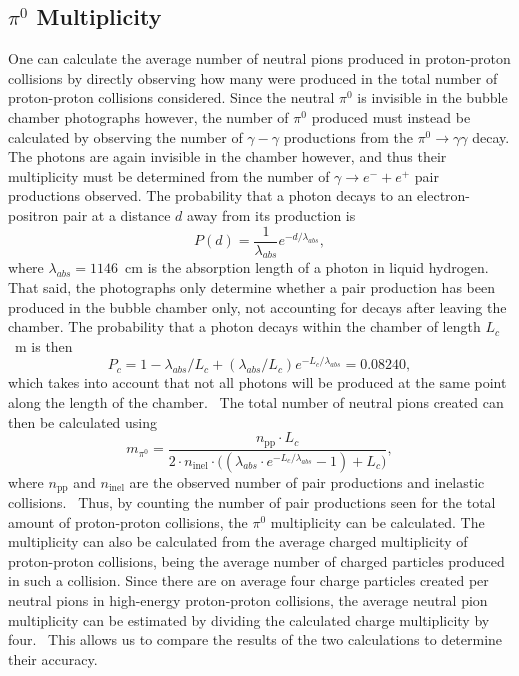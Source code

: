 \documentclass[twocolumn]{article}
\begin{document}
\subsection{$\pi^0$ Multiplicity}
One can calculate the average number of neutral pions produced in proton-proton collisions by directly observing how many were produced in the total number of proton-proton collisions considered. Since the neutral $\pi^0$ is invisible in the bubble chamber photographs however, the number of $\pi^0$ produced must instead be calculated by observing the number of $\gamma-\gamma$ productions from the $\pi^0 \to \gamma \gamma$ decay. The photons are again invisible in the chamber however, and thus their multiplicity must be determined from the number of $\gamma \to e^- + e^+$ pair productions observed. The probability that a photon decays to an electron-positron pair at a distance $d$ away from its production is~\cite{seul}
\begin{equation*}
P(d) = \frac {1} {\lambda_{abs}} e^{-d/\lambda_{abs}},
\end{equation*}
where $\lambda_{abs} = 1146$~cm is the absorption length of a photon in liquid hydrogen. That said, the photographs only determine whether a pair production has been produced in the bubble chamber only, not accounting for decays after leaving the chamber. The probability that a photon decays within the chamber of length $L_c$~m is then
\begin{equation}
P_c = 1-\lambda_{abs}/L_c +  (\lambda_{abs}/L_c) e^{-L_c/\lambda_{abs}} = 0.08240,
\end{equation}
which takes into account that not all photons will be produced at the same point along the length of the chamber.~\cite{seul} The total number of neutral pions created can then be calculated using
\begin{equation} \label{eq:mult}
m_{\pi^0} = \frac{n_{\text{pp}}\cdot L_c}{2\cdot n_{\text{inel}} \cdot \big((\lambda_{abs} \cdot e^{- L_c/\lambda_{abs}}-1)+L_c\big)},
\end{equation}
where $n_{\text{pp}}$ and $n_{\text{inel}}$ are the observed number of pair productions and inelastic collisions.~\cite{seul} Thus, by counting the number of pair productions seen for the total amount of proton-proton collisions, the $\pi^0$ multiplicity can be calculated. The multiplicity can also be calculated from the average charged multiplicity of proton-proton collisions, being the average number of charged particles produced in such a collision. Since there are on average four charge particles created per neutral pions in high-energy proton-proton collisions, the average neutral pion multiplicity can be estimated by dividing the calculated charge multiplicity by four.~\cite{Fernow} This allows us to compare the results of the two calculations to determine their accuracy.
\end{document}
